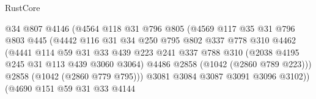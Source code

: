 \begin{lexlean}{RustCore}
\begin{coremodule}
                                    @34
                                    @807
                                    @4146
                                    (@4564
                                      @118
                                      @31
                                      @796
                                      @805
                                      (@4569
                                        @117
                                        @35
                                        @31
                                        @796
                                        @803
                                        @445
                                        (@4442
                                          @116
                                          @31
                                          @34
                                          @250
                                          @795
                                          @802
                                          @337
                                          @778
                                          @310
                                          @4462
                                          (@4441
                                            @114
                                            @59
                                            @31
                                            @33
                                            @439
                                            @223
                                            @241
                                            @337
                                            @788
                                            @310
                                            (@2038 @4195 @245 @31 @113 @439 @3060 @3064)
                                            @4486
                                            @2858
                                            (@1042 (@2860 @789 @223)))
                                          @2858
                                          (@1042 (@2860 @779 @795)))
                                        @3081
                                        @3084
                                        @3087
                                        @3091
                                        @3096
                                        @3102))
                                    (@4690
                                      @151
                                      @59
                                      @31
                                      @33
                                      @4144

\end{coremodule}
\end{lexlean}
